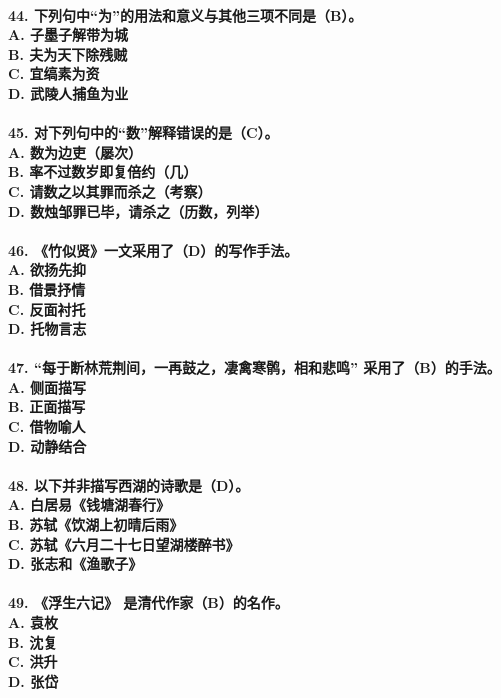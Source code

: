 \documentclass[UTF8]{ctexart} %
\begin{document}
\paragraph{
44. 下列句中“为”的用法和意义与其他三项不同是（\color{red}B\color{black}）。 \\
    A. 子墨子解带为城 \\
    B. 夫为天下除残贼 \\
    C. 宜缟素为资 \\
    D. 武陵人捕鱼为业
}
\paragraph{
45. 对下列句中的“数”解释错误的是（\color{red}C\color{black}）。 \\
    A. 数为边吏（屡次） \\
    B. 率不过数岁即复倍约（几） \\
    C. 请数之以其罪而杀之（考察） \\
    D. 数烛邹罪已毕，请杀之（历数，列举）
}
\paragraph{
46. 《竹似贤》一文采用了（\color{red}D\color{black}）的写作手法。 \\
    A. 欲扬先抑 \\
    B. 借景抒情 \\
    C. 反面衬托 \\
    D. 托物言志
}
\paragraph{
47. “每于断林荒荆间，一再鼓之，凄禽寒鹘，相和悲鸣” 采用了（\color{red}B\color{black}）的手法。 \\
    A. 侧面描写 \\
    B. 正面描写 \\
    C. 借物喻人 \\
    D. 动静结合
}
\paragraph{
48. 以下并非描写西湖的诗歌是（\color{red}D\color{black}）。 \\
    A. 白居易《钱塘湖春行》 \\
    B. 苏轼《饮湖上初晴后雨》 \\
    C. 苏轼《六月二十七日望湖楼醉书》 \\
    D. 张志和《渔歌子》
}
\paragraph{
49. 《浮生六记》 是清代作家（\color{red}B\color{black}）的名作。 \\
    A. 袁枚 \\
    B. 沈复 \\
    C. 洪升 \\
    D. 张岱
}
\end{document}
